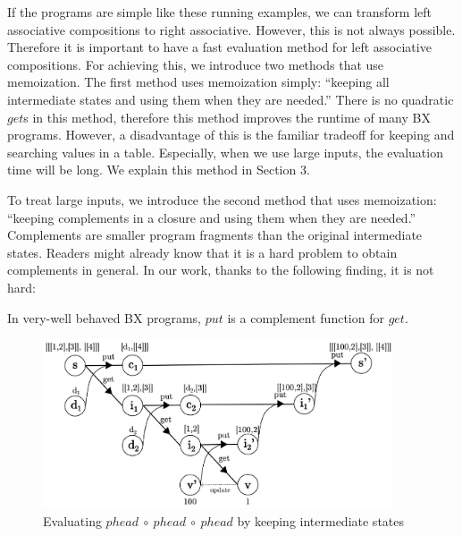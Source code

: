 If the programs are simple like these running examples, we can transform left associative compositions to right associative. However, this is not always possible. Therefore it is important to have a fast evaluation method for left associative compositions.
For achieving this, we introduce two methods that use memoization.
The first method uses memoization simply: ``keeping all intermediate states and using them when they are needed.'' There is no quadratic $get$s in this method, therefore this method improves the runtime of many BX programs. However, a disadvantage of this is the familiar tradeoff for keeping and searching values in a table. Especially, when we use large inputs, the evaluation time will be long. We explain this method in Section 3.

To treat large inputs, we introduce the second method that uses memoization: ``keeping complements in a closure and using them when they are needed.'' Complements are smaller program fragments than the original intermediate states.
Readers might already know that it is a hard problem to obtain complements in general. In our work, thanks to the following finding, it is not hard:

\vspace{2mm}
In very-well behaved \cite{} BX programs, 
$put$ is a complement function for $get$.
\vspace{2mm}

\begin{figure}[!t]
  \centering
  \includegraphics[height=5cm]{./fig/fig3.eps}
  \caption{Evaluating $phead \ \circ \ phead \ \circ \ phead$ by keeping intermediate states}
  \label{fig:eval-comp-phead-2}
\end{figure}

